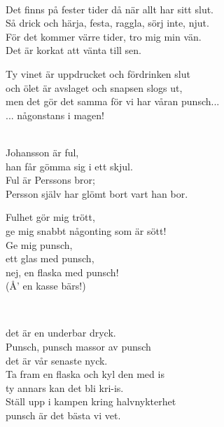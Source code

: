  \\       
\author{Text: Chrischan Johanson}

\songtext{}   
Det finns på fester tider då när allt har sitt slut.\\
Så drick och härja, festa, raggla, sörj inte, njut.\\
För det kommer värre tider, tro mig min vän.\\
Det är korkat att vänta till sen.

Ty vinet är uppdrucket och fördrinken slut\\
och ölet är avslaget och snapsen slogs ut,\\
men det gör det samma för vi har våran punsch...\\
... någonstans i magen!\\

 \\       

\songtext{}Johansson är ful,\\     
han får gömma sig i ett skjul. \\
Ful är Perssons bror; \\
Persson själv har glömt bort vart han bor.

Fulhet gör mig trött, \\
ge mig snabbt någonting som är sött! \\
Ge mig punsch, \\
ett glas med punsch, \\
nej, en flaska med punsch! \\
(Å' en kasse bärs!) \\

\newpage 


 \\       

det är en underbar dryck.\\
Punsch, punsch massor av punsch \\
det är vår senaste nyck.\\
Ta fram en flaska och kyl den med is \\
ty annars kan det bli kri-is. \\
Ställ upp i kampen kring halvnykterhet \\
punsch är det bästa vi vet. \\

